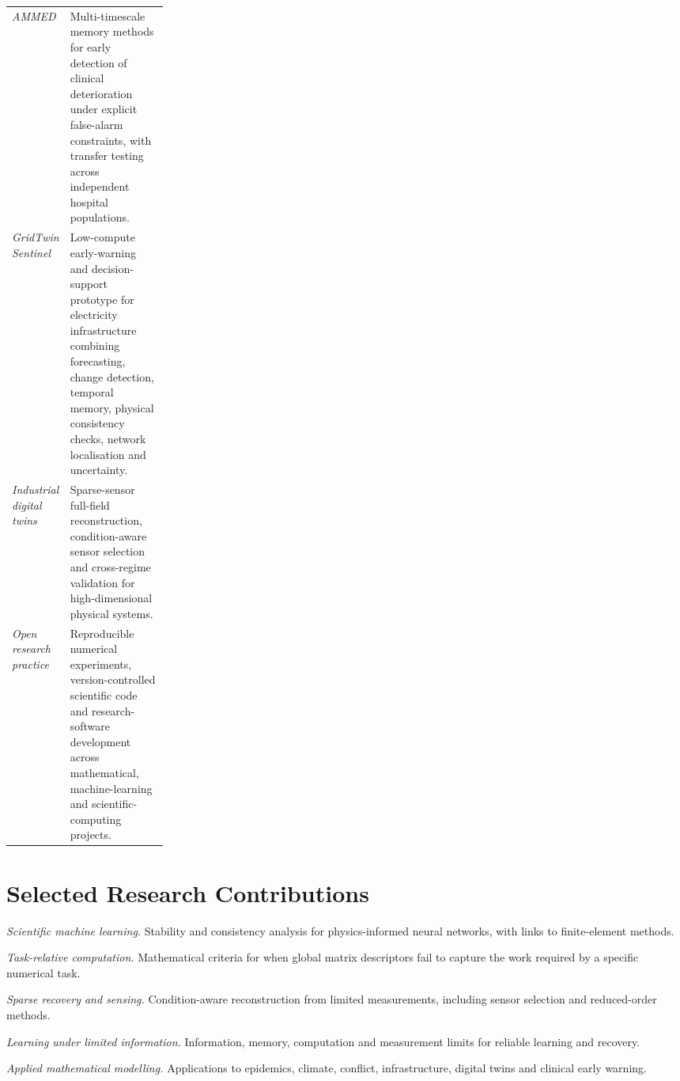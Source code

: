 \documentclass[11pt,a4paper]{article}
\begin{document}
\begin{tabularx}{\linewidth}
{@{}>{\raggedright\arraybackslash}p{0.23\linewidth} X@{}}

\textit{AMMED}
&
Multi-timescale memory methods for early detection of clinical
deterioration under explicit false-alarm constraints, with transfer
testing across independent hospital populations.
\\[4pt]

\textit{GridTwin Sentinel}
&
Low-compute early-warning and decision-support prototype for
electricity infrastructure combining forecasting, change detection,
temporal memory, physical consistency checks, network localisation
and uncertainty.
\\[4pt]

\textit{Industrial digital twins}
&
Sparse-sensor full-field reconstruction, condition-aware sensor
selection and cross-regime validation for high-dimensional
physical systems.
\\[4pt]

\textit{Open research practice}
&
Reproducible numerical experiments, version-controlled scientific
code and research-software development across mathematical,
machine-learning and scientific-computing projects.

\end{tabularx}

\section{Selected Research Contributions}

\textit{Scientific machine learning.}
Stability and consistency analysis for physics-informed neural networks, with links to finite-element methods.

\textit{Task-relative computation.}
Mathematical criteria for when global matrix descriptors fail to capture the work required by a specific numerical task.

\textit{Sparse recovery and sensing.}
Condition-aware reconstruction from limited measurements, including sensor selection and reduced-order methods.

\textit{Learning under limited information.}
Information, memory, computation and measurement limits for reliable learning and recovery.

\textit{Applied mathematical modelling.}
Applications to epidemics, climate, conflict, infrastructure, digital twins and clinical early warning.

\end{document}
